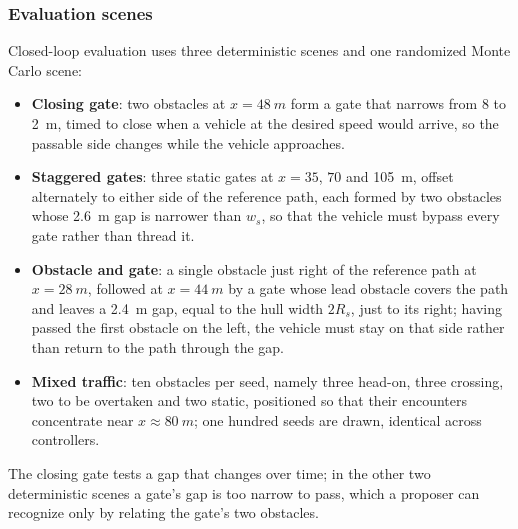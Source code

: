 \documentclass{article}
\theoremstyle{definition}
\begin{document}
\subsubsection*{\texorpdfstring{Evaluation scenes}{Evaluation scenes}}
Closed-loop evaluation uses three deterministic scenes and one randomized
Monte Carlo scene:
\begingroup\sloppy
\begin{itemize}
\item \textbf{Closing gate}: two obstacles at $x=\SI{48}{m}$ form a gate that
narrows from $8$ to \SI{2}{m}, timed to close when a vehicle at the desired speed
would arrive, so the passable side changes while the vehicle approaches.
\item \textbf{Staggered gates}: three static gates at $x=35$, $70$ and
\SI{105}{m}, offset alternately to either side of the reference path, each
formed by two obstacles whose \SI{2.6}{m} gap is narrower than $w_s$, so that
the vehicle must bypass every gate rather than thread it.
\item \textbf{Obstacle and gate}: a single obstacle just right of the reference
path at $x=\SI{28}{m}$, followed at $x=\SI{44}{m}$ by a gate whose lead obstacle covers the path and leaves a \SI{2.4}{m} gap, equal to the hull width $2R_s$, just to its right; having passed the first obstacle on the left, the vehicle must stay
on that side rather than return to the path through the gap.
\item \textbf{Mixed traffic}: ten obstacles per seed, namely three head-on,
three crossing, two to be overtaken and two static, positioned so that their
encounters concentrate near $x\approx\SI{80}{m}$; one hundred seeds are drawn,
identical across controllers.
\end{itemize}
\endgroup
The closing gate tests a gap that changes over time; in the other two deterministic scenes a gate's gap is too narrow to pass, which a proposer can recognize only by relating the gate's two obstacles.
\end{document}
